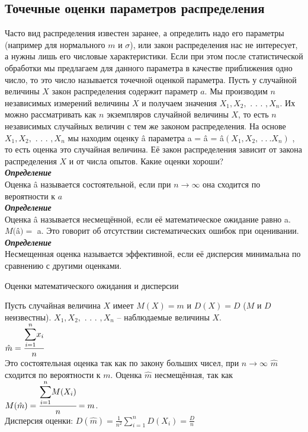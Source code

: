 \documentclass[russian, 12pt, fleqn]{article}
\begin{document}
\subsection{Точечные оценки параметров распределения}
\noindent
Часто вид распределения известен заранее, а определить надо его параметры (например для нормального $m$ и $\sigma$), или закон распределения нас не интересует, а нужны лишь его числовые характеристики.  Если при этом после статистической обработки мы предлагаем для данного параметра в качестве приближения одно число, то это число называется точечной оценкой параметра. Пусть у случайной величины $X$ закон распределения содержит параметр $a$. Мы производим $n$ независимых измерений величины $X$ и получаем значения $X_1, X_2, $ . . . $,X_n$. Их можно рассматривать как $n$ экземпляров случайной величины $X$, то есть $n$ независимых случайных величин с тем же законом распределения. На основе $X_1, X_2, $ . . . $,X_n$ мы находим оценку â параметра a = â  = â$(X_1, X_2, \ .\ .\ . X_n)$ , то есть оценка это случайная величина. Её закон распределения зависит от закона распределения $X$ и от числа опытов. Какие оценки хороши?\\
\textit{\textbf{Определение}} \\
Оценка â называется состоятельной, если при $n \rightarrow \infty$ она сходится по вероятности к $a$\\
\textit{\textbf{Определение}} \\
Оценка â называется несмещённой, если её математическое ожидание равно a. $M($â$) = $ a. Это говорит об отсутствии систематических ошибок при оценивании.\\
\textit{\textbf{Определение}} \\
Несмещенная оценка называется эффективной, если её дисперсия минимальна по сравнению с другими оценками.
\begin{center}
$\textbf{Оценки математического ожидания и дисперсии}$
\end{center}
Пусть случайная величина $X$ имеет $M(X) = m$ и $D(X) = D$ ($M$ и $D$ неизвестны). $X_1, X_2, $ . . . $,X_n$ -- наблюдаемые величины $X$.\\
 $\hat{m} =  \cfrac{\displaystyle{\sum \limits_{i = 1}^{ n }}x_i}{n} $ \normalsize\\
Это состоятельная оценка так как по закону больших чисел, при $n \rightarrow \infty$  $\hat{m}$ сходится по вероятности к $m$. Оценка $\hat{m}$ несмещённая, так как \\$M(\hat{m}) =\cfrac{  \displaystyle{\sum \limits_{i = 1}^{n}} M(X_i)  }{n} = m$.\\ Дисперсия оценки: $D(\hat{m}) = \frac{1}{n^2} \displaystyle{\sum \limits_{i = 1}^{n}}D(X_i)	  = \frac{D}{n}$\\
\end{document}
